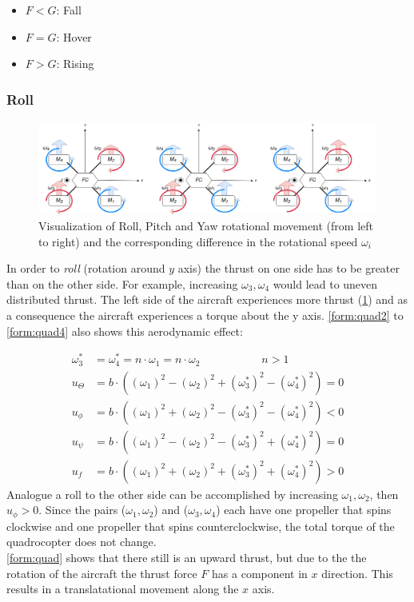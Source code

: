 \begin{itemize}
	\item $F < G$: Fall
	\item $F = G$: Hover
	\item $F > G$: Rising 
\end{itemize}

\newpage

\subsubsection{Roll}
\begin{figure}
	\centering
	\includegraphics[width=\linewidth]{figures/move.png}
	\caption{Visualization of Roll, Pitch and Yaw rotational movement (from left to right) and the corresponding difference in the rotational speed $\omega_i$}
	\label{fig:move}
\end{figure}
In order to \emph{roll} (rotation around $y$ axis) the thrust on one side has to be greater than on the other side. For example,
increasing $\omega_3, \omega_4$ would lead to uneven distributed thrust. The left side of the aircraft experiences more thrust (\cref{fig:move}) and as a consequence the aircraft experiences a torque about the y axis.
\cref{form:quad2} to \cref{form:quad4} also shows this aerodynamic effect:

\begin{align*}
	\omega_3^* &= \omega_4^* = n \cdot \omega_1 = n \cdot \omega_2 \qquad \qquad \quad \enspace  n > 1\\
	u_{\Theta} &= b \cdot ((\omega_1)^2 - (\omega_2)^2 + (\omega_3^*)^2 - (\omega_4^*)^2) = 0\\
	u_{\phi} &= b \cdot ((\omega_1)^2 + (\omega_2)^2 - (\omega_3^*)^2 - (\omega_4^*)^2) < 0 \\
	u_{\psi} &= b \cdot ((\omega_1)^2 - (\omega_2)^2 - (\omega_3^*)^2 + (\omega_4^*)^2)	= 0 \\
	u_f &= b \cdot ((\omega_1)^2 + (\omega_2)^2 + (\omega_3^*)^2 + (\omega_4^*)^2) > 0 
\end{align*}
\newline
Analogue a roll to the other side can be accomplished by increasing $\omega_1, \omega_2$, then $u_{\phi} > 0$. 
Since the pairs ($\omega_1, \omega_2$) and ($\omega_3, \omega_4$) each have one propeller that spins clockwise and one propeller that spins counterclockwise, the total torque of the quadrocopter does not change.\\
\cref{form:quad} shows that there still is an upward thrust, but due to the the rotation of the aircraft the thrust force $F$ has a component in $x$ direction. This results in a translatational movement along the $x$ axis.

